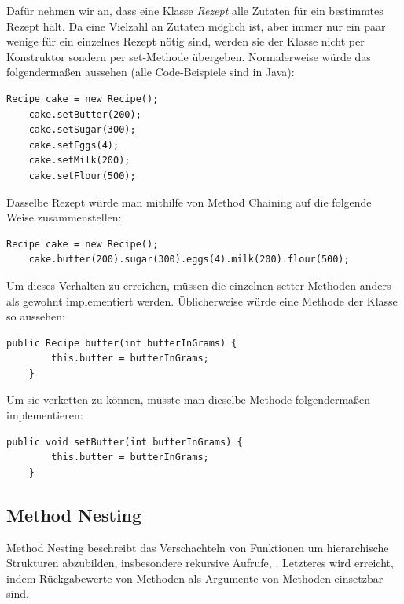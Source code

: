 Dafür nehmen wir an, dass eine Klasse \emph{Rezept} alle Zutaten für ein bestimmtes Rezept hält. Da eine Vielzahl an Zutaten möglich ist, aber immer nur ein paar wenige für ein einzelnes Rezept nötig sind, werden sie der Klasse nicht per Konstruktor sondern per set-Methode übergeben. Normalerweise würde das folgendermaßen aussehen (alle Code-Beispiele sind in Java):\\

\begin{lstlisting}[caption=Erstellung eines Rezepts auf normale Weise]
	Recipe cake = new Recipe();
	cake.setButter(200);
	cake.setSugar(300);
	cake.setEggs(4);
	cake.setMilk(200);
	cake.setFlour(500);
\end{lstlisting}

\noindent
Dasselbe Rezept würde man mithilfe von Method Chaining auf die folgende Weise zusammenstellen:\\


\begin{lstlisting}[caption=Erstellung desselben Rezepts mit Method Chaining]
	Recipe cake = new Recipe();
	cake.butter(200).sugar(300).eggs(4).milk(200).flour(500);
\end{lstlisting}

Um dieses Verhalten zu erreichen, müssen die einzelnen setter-Methoden anders als gewohnt implementiert werden. Üblicherweise würde eine Methode der Klasse so aussehen:\\

\begin{lstlisting}[caption={set-Methode, implementiert zur Aneinaderreihung}]
	public Recipe butter(int butterInGrams) {
		this.butter = butterInGrams;
	}
\end{lstlisting}

Um sie verketten zu können, müsste man dieselbe Methode folgendermaßen implementieren:\\

\begin{lstlisting}[caption=set-Methode in der üblichen Implementierung]
	public void setButter(int butterInGrams) {
		this.butter = butterInGrams;
	}
\end{lstlisting}

\subsection{Method Nesting}\label{ssct:4.1.2:nesting}
Method Nesting beschreibt das Verschachteln von Funktionen um hierarchische Strukturen abzubilden, insbesondere rekursive Aufrufe\cite{book:fowlerDSL}, \cite{vl:drachen:teil3}. Letzteres wird erreicht, indem Rückgabewerte von Methoden als Argumente von Methoden einsetzbar sind.

